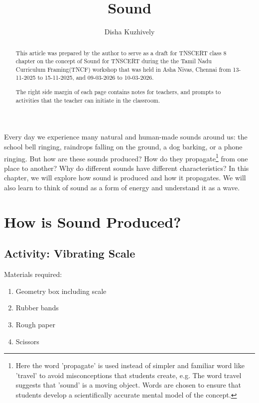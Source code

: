 \documentclass[12pt,a4paper]{tufte-handout}
\title{Sound}
\author[dishajk]{Disha Kuzhively}
\begin{document}
\maketitle%

\begin{abstract}
\noindent
This article was prepared by the author to serve as a draft for TNSCERT class 8 chapter on the concept of Sound for TNSCERT during the the Tamil Nadu Curriculum Framing(TNCF) workshop that was held in Asha Nivas, Chennai  from 13-11-2025 to 15-11-2025, and 09-03-2026 to 10-03-2026.

The right side margin of each page contains notes for teachers, and prompts to activities that the teacher can initiate in the classroom.
\end{abstract}


Every day we experience many natural and human-made sounds around us: the school bell ringing, raindrops falling on the ground, a dog barking, or a phone ringing.  But how are these sounds produced? How do they propagate\footnote{Here the word 'propagate' is used instead of simpler and familiar word like 'travel' to avoid misconceptions that students create, e.g. The word travel suggests that 'sound' is a moving object. Words are chosen to ensure that students develop a scientifically accurate mental model of the concept.} from one place to another? Why do different sounds have different characteristics? In this chapter, we will explore how sound is produced and how it propagates. We will also learn to think of sound as a form of energy and understand it as a wave.

\section{How is Sound Produced?}\label{sec:production}
\subsection{Activity: Vibrating Scale}\label{sec:production-activity}

Materials required:
\begin{enumerate}
    \item Geometry box including scale
    \item Rubber bands
    \item Rough paper
    \item Scissors
\end{enumerate}
\end{document}
